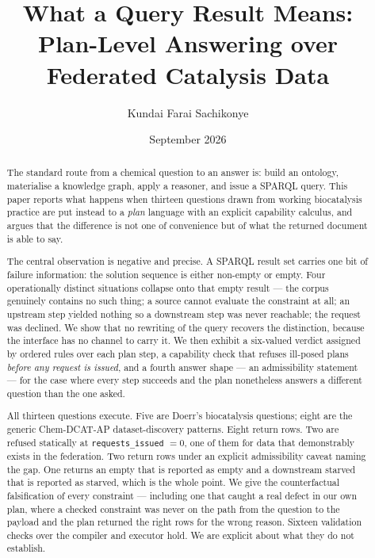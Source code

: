 \documentclass[11pt,a4paper]{article}
\title{What a Query Result Means:\\
Plan-Level Answering over Federated Catalysis Data}
\author{Kundai Farai Sachikonye}
\date{September 2026}
\theoremstyle{plain}
\theoremstyle{definition}
\theoremstyle{remark}
\newcommand{\vempty}{\textsf{empty}}
\newcommand{\vstarve}{\textsf{starved}}
\begin{document}
\maketitle

\begin{abstract}
The standard route from a chemical question to an answer is: build an
ontology, materialise a knowledge graph, apply a reasoner, and issue a
SPARQL query. This paper reports what happens when thirteen questions
drawn from working biocatalysis practice are put instead to a
\emph{plan} language with an explicit capability calculus, and argues
that the difference is not one of convenience but of what the returned
document is able to say.

The central observation is negative and precise. A SPARQL result set
carries one bit of failure information: the solution sequence is either
non-empty or empty. Four operationally distinct situations collapse onto
that empty result --- the corpus genuinely contains no such thing; a
source cannot evaluate the constraint at all; an upstream step yielded
nothing so a downstream step was never reachable; the request was
declined. We show that no rewriting of the query recovers the
distinction, because the interface has no channel to carry it. We then
exhibit a six-valued verdict assigned by ordered rules over each plan
step, a capability check that refuses ill-posed plans \emph{before any
request is issued}, and a fourth answer shape --- an admissibility
statement --- for the case where every step succeeds and the plan
nonetheless answers a different question than the one asked.

All thirteen questions execute. Five are Doerr's biocatalysis
questions; eight are the generic Chem-DCAT-AP dataset-discovery
patterns. Eight return rows. Two are refused statically at
\texttt{requests\_issued} $= 0$, one of them for data that demonstrably
exists in the federation. Two return rows under an explicit
admissibility caveat naming the gap. One returns an \vempty{} that is
reported as \vempty{} and a downstream \vstarve{} that is reported as
\vstarve{}, which is the whole point. We give the counterfactual
falsification of every constraint --- including one that caught a real
defect in our own plan, where a checked constraint was never on the path
from the question to the payload and the plan returned the right rows
for the wrong reason. Sixteen validation checks over the compiler and
executor hold. We are explicit about what they do not establish.
\end{abstract}
\end{document}
